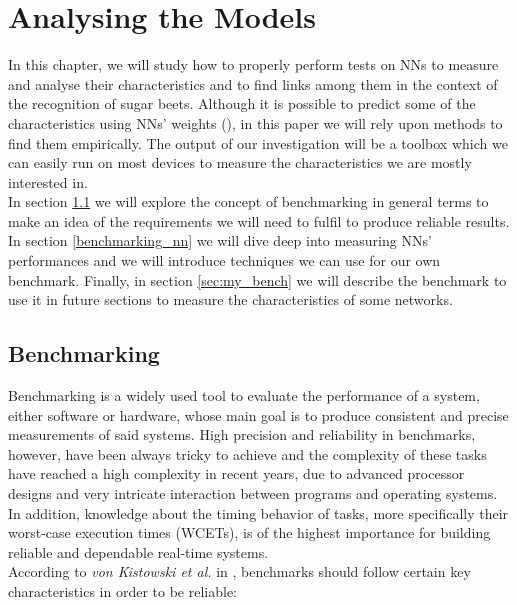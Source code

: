 \chapter{Analysing the Models}\label{ana_models}
In this chapter, we will study how to properly perform tests on NNs to measure and analyse their characteristics and to find links among them in the context of the recognition of sugar beets. Although it is possible to predict some of the characteristics using NNs' weights (\cite{Unterthiner2020PredictingNN}), in this paper we will rely upon methods to find them empirically. The output of our investigation will be a toolbox which we can easily run on most devices to measure the characteristics we are mostly interested in. \\
In section \ref{benchmarking} we will explore the concept of benchmarking in general terms to make an idea of the requirements we will need to fulfil to produce reliable results. In section \ref{benchmarking_nn} we will dive deep into measuring NNs' performances and we will introduce techniques we can use for our own benchmark. Finally, in section \ref{sec:my_bench} we will describe the benchmark to use it in future sections to measure the characteristics of some networks. 

\section{Benchmarking}\label{benchmarking}
Benchmarking is a widely used tool to evaluate the performance of a system, either software or hardware, whose main goal is to produce consistent and precise measurements of said systems. High precision and reliability in benchmarks, however, have been always tricky to achieve and the complexity of these tasks have reached a high complexity in recent years, due to advanced processor designs and very intricate interaction between programs and operating systems. \cite{DBLP:journals/corr/abs-1811-01412}\\
In addition, knowledge about the timing behavior of tasks, more specifically their worst-case execution times (WCETs), is of the highest importance for building reliable and dependable real-time systems. \cite{Real-Time-Systems}\\
According to \textit{von Kistowski et al.} in \cite{how_to_bench}, benchmarks should follow certain key characteristics in order to be reliable:

